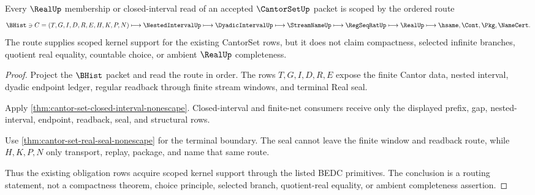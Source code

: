 \begin{theorem}
\label{thm:cantorset-scoped-real-seal-route}
Every $\RealUp$ membership or closed-interval read of an accepted $\CantorSetUp$ packet is scoped by the ordered route
$$
\BHist \ni C=(T,G,I,D,R,E,H,K,P,N)
\longmapsto \NestedIntervalUp
\longmapsto \DyadicIntervalUp
\longmapsto \StreamNameUp
\longmapsto \RegSeqRatUp
\longmapsto \RealUp
\longmapsto \hsame,\Cont,\Pkg,\NameCert .
$$
The route supplies scoped kernel support for the existing CantorSet rows, but it does not claim compactness, selected infinite branches, quotient real equality, countable choice, or ambient $\RealUp$ completeness.
\end{theorem}
\begin{proof}
Project the $\BHist$ packet and read the route in order. The rows $T,G,I,D,R,E$ expose the finite Cantor data, nested interval, dyadic endpoint ledger, regular readback through finite stream windows, and terminal Real seal.

Apply \autoref{thm:cantor-set-closed-interval-nonescape}. Closed-interval and finite-net consumers receive only the displayed prefix, gap, nested-interval, endpoint, readback, seal, and structural rows.

Use \autoref{thm:cantor-set-real-seal-nonescape} for the terminal boundary. The seal cannot leave the finite window and readback route, while $H,K,P,N$ only transport, replay, package, and name that same route.

Thus the existing obligation rows acquire scoped kernel support through the listed BEDC primitives. The conclusion is a routing statement, not a compactness theorem, choice principle, selected branch, quotient-real equality, or ambient completeness assertion.
\end{proof}

